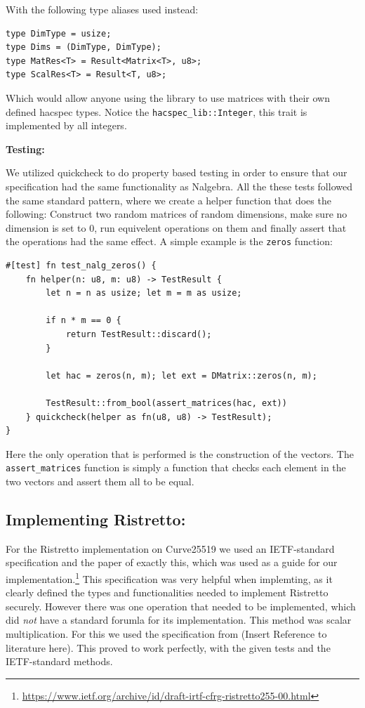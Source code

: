 \documentclass{article}
\begin{document}
With the following type aliases used instead:

\begin{lstlisting}
type DimType = usize;
type Dims = (DimType, DimType);
type MatRes<T> = Result<Matrix<T>, u8>;
type ScalRes<T> = Result<T, u8>;
\end{lstlisting}

Which would allow anyone using the library to use matrices with their
own defined hacspec types. Notice the \texttt{hacspec\_lib::Integer},
this trait is implemented by all integers.

\textbf{Testing:}

We utilized quickcheck to do property based testing in order to ensure
that our specification had the same functionality as Nalgebra. All
the these tests followed the same standard pattern, where we create a
helper function that does the following: Construct two random matrices
of random dimensions, make sure no dimension is set to 0, run equivelent
operations on them and finally assert that the operations had the same
effect. A simple example is the \texttt{zeros} function:

\begin{lstlisting}
#[test] fn test_nalg_zeros() {
    fn helper(n: u8, m: u8) -> TestResult {
        let n = n as usize; let m = m as usize;

        if n * m == 0 {
            return TestResult::discard();
        }

        let hac = zeros(n, m); let ext = DMatrix::zeros(n, m);

        TestResult::from_bool(assert_matrices(hac, ext))
    } quickcheck(helper as fn(u8, u8) -> TestResult);
}
\end{lstlisting}

Here the only operation that is performed is the construction of the
vectors. The \texttt{assert\_matrices} function is simply a function
that checks each element in the two vectors and assert them all to
be equal.

\subsection{Implementing Ristretto:} \label{implementing-ristretto}

For the Ristretto implementation on Curve25519
we used an IETF-standard specification and the
paper of exactly this, which was used as a guide for our
implementation.\footnote{\url{https://www.ietf.org/archive/id/draft-irtf-cfrg-ristretto255-00.html}}
This specification was very helpful when implemting, as it clearly
defined the types and functionalities needed to implement Ristretto
securely. However there was one operation that needed to be implemented, which did \textit{not} have a standard forumla for its implementation. This method was scalar multiplication. For this we used the specification from (Insert Reference to literature here). This proved to work perfectly, with the given tests and the IETF-standard methods. 
\end{document}

